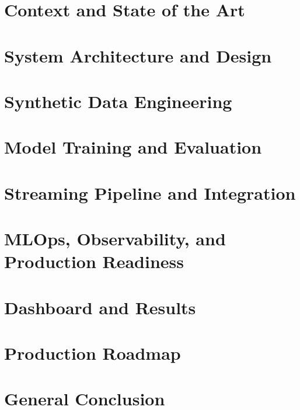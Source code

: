 \documentclass[a4paper,12pt]{report}
\begin{document}
\chapter{Context and State of the Art}
\label{ch:context}


\chapter{System Architecture and Design}
\label{ch:architecture}


\chapter{Synthetic Data Engineering}
\label{ch:synthetic}


\chapter{Model Training and Evaluation}
\label{ch:training}


\chapter{Streaming Pipeline and Integration}
\label{ch:streaming}


\chapter{MLOps, Observability, and Production Readiness}
\label{ch:mlops}


\chapter{Dashboard and Results}
\label{ch:dashboard}


\chapter{Production Roadmap }
\label{ch:roadmap}


\chapter*{General Conclusion}

\end{document}
